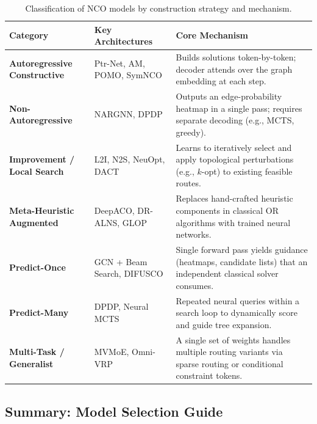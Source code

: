 \documentclass{article}
\begin{document}
\begin{table}[H]
    \centering
    \caption{Classification of NCO models by construction strategy and mechanism.}
    \begin{tabularx}{\textwidth}{@{} l l X @{}}
        \toprule
        \textbf{Category} & \textbf{Key Architectures} & \textbf{Core Mechanism} \\
        \midrule
        \textbf{Autoregressive Constructive} & Ptr-Net, AM, POMO, SymNCO & Builds solutions token-by-token; decoder attends over the graph embedding at each step. \\
        \textbf{Non-Autoregressive} & NARGNN, DPDP & Outputs an edge-probability heatmap in a single pass; requires separate decoding (e.g., MCTS, greedy). \\
        \textbf{Improvement / Local Search} & L2I, N2S, NeuOpt, DACT & Learns to iteratively select and apply topological perturbations (e.g., $k$-opt) to existing feasible routes. \\
        \textbf{Meta-Heuristic Augmented} & DeepACO, DR-ALNS, GLOP & Replaces hand-crafted heuristic components in classical OR algorithms with trained neural networks. \\
        \textbf{Predict-Once} & GCN + Beam Search, DIFUSCO & Single forward pass yields guidance (heatmaps, candidate lists) that an independent classical solver consumes. \\
        \textbf{Predict-Many} & DPDP, Neural MCTS & Repeated neural queries within a search loop to dynamically score and guide tree expansion. \\
        \textbf{Multi-Task / Generalist} & MVMoE, Omni-VRP & A single set of weights handles multiple routing variants via sparse routing or conditional constraint tokens. \\
        \bottomrule
    \end{tabularx}
\end{table}

\subsection*{Summary: Model Selection Guide}
\end{document}
